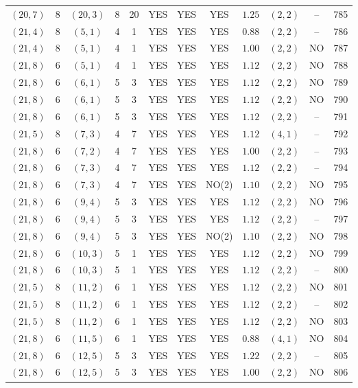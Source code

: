 \begin{longtable}{|c|c|c|c|c|c|c|c|c|c|c|c|}
$(20,7)$ & 8 & $(20,3)$ & 8 & 20 & YES & YES & YES & $1.25$ & $(2,2)$ & -- & 785\\
$(21,4)$ & 8 & $(5,1)$ & 4 & 1 & YES & YES & YES & $0.88$ & $(2,2)$ & -- & 786\\
$(21,4)$ & 8 & $(5,1)$ & 4 & 1 & YES & YES & YES & $1.00$ & $(2,2)$ & NO & 787\\
$(21,8)$ & 6 & $(5,1)$ & 4 & 1 & YES & YES & YES & $1.12$ & $(2,2)$ & NO & 788\\
$(21,8)$ & 6 & $(6,1)$ & 5 & 3 & YES & YES & YES & $1.12$ & $(2,2)$ & NO & 789\\
$(21,8)$ & 6 & $(6,1)$ & 5 & 3 & YES & YES & YES & $1.12$ & $(2,2)$ & NO & 790\\
$(21,8)$ & 6 & $(6,1)$ & 5 & 3 & YES & YES & YES & $1.12$ & $(2,2)$ & -- & 791\\
$(21,5)$ & 8 & $(7,3)$ & 4 & 7 & YES & YES & YES & $1.12$ & $(4,1)$ & -- & 792\\
$(21,8)$ & 6 & $(7,2)$ & 4 & 7 & YES & YES & YES & $1.00$ & $(2,2)$ & -- & 793\\
$(21,8)$ & 6 & $(7,3)$ & 4 & 7 & YES & YES & YES & $1.12$ & $(2,2)$ & -- & 794\\
$(21,8)$ & 6 & $(7,3)$ & 4 & 7 & YES & YES & NO(2) & $1.10$ & $(2,2)$ & NO & 795\\
$(21,8)$ & 6 & $(9,4)$ & 5 & 3 & YES & YES & YES & $1.12$ & $(2,2)$ & NO & 796\\
$(21,8)$ & 6 & $(9,4)$ & 5 & 3 & YES & YES & YES & $1.12$ & $(2,2)$ & -- & 797\\
$(21,8)$ & 6 & $(9,4)$ & 5 & 3 & YES & YES & NO(2) & $1.10$ & $(2,2)$ & NO & 798\\
$(21,8)$ & 6 & $(10,3)$ & 5 & 1 & YES & YES & YES & $1.12$ & $(2,2)$ & NO & 799\\
$(21,8)$ & 6 & $(10,3)$ & 5 & 1 & YES & YES & YES & $1.12$ & $(2,2)$ & -- & 800\\
$(21,5)$ & 8 & $(11,2)$ & 6 & 1 & YES & YES & YES & $1.12$ & $(2,2)$ & NO & 801\\
$(21,5)$ & 8 & $(11,2)$ & 6 & 1 & YES & YES & YES & $1.12$ & $(2,2)$ & -- & 802\\
$(21,5)$ & 8 & $(11,2)$ & 6 & 1 & YES & YES & YES & $1.12$ & $(2,2)$ & NO & 803\\
$(21,8)$ & 6 & $(11,5)$ & 6 & 1 & YES & YES & YES & $0.88$ & $(4,1)$ & NO & 804\\
$(21,8)$ & 6 & $(12,5)$ & 5 & 3 & YES & YES & YES & $1.22$ & $(2,2)$ & -- & 805\\
$(21,8)$ & 6 & $(12,5)$ & 5 & 3 & YES & YES & YES & $1.00$ & $(2,2)$ & NO & 806\\

\end{longtable}
